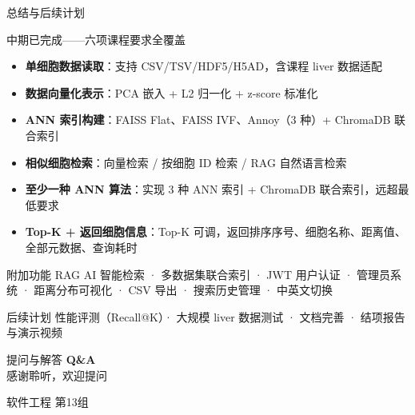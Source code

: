 \documentclass[aspectratio=169]{beamer}
\begin{document}

\begin{frame}{总结与后续计划}
\small

\begin{block}{中期已完成——六项课程要求全覆盖}
  \begin{itemize}
    \item \textbf{单细胞数据读取}：支持 CSV/TSV/HDF5/H5AD，含课程 liver 数据适配
    \item \textbf{数据向量化表示}：PCA 嵌入 + L2 归一化 + z-score 标准化
    \item \textbf{ANN 索引构建}：FAISS Flat、FAISS IVF、Annoy（3 种）+ ChromaDB 联合索引
    \item \textbf{相似细胞检索}：向量检索 / 按细胞 ID 检索 / RAG 自然语言检索
    \item \textbf{至少一种 ANN 算法}：实现 3 种 ANN 索引 + ChromaDB 联合索引，远超最低要求
    \item \textbf{Top-K + 返回细胞信息}：Top-K 可调，返回排序序号、细胞名称、距离值、全部元数据、查询耗时
  \end{itemize}
\end{block}

\vspace{0.2em}
\begin{exampleblock}{附加功能}
  RAG AI 智能检索 · 多数据集联合索引 · JWT 用户认证 · 管理员系统 · 距离分布可视化 · CSV 导出 · 搜索历史管理 · 中英文切换
\end{exampleblock}

\vspace{0.2em}
\begin{exampleblock}{后续计划}
  性能评测（Recall@K）· 大规模 liver 数据测试 · 文档完善 · 结项报告与演示视频
\end{exampleblock}

\end{frame}

\begin{frame}{提问与解答}
  \centering
  \vspace{0.8cm}
  {\Huge {\bfseries Q\&A} \\
  \vspace{0.25em} \Large 感谢聆听，欢迎提问}

  \vspace{1.5cm}
  \normalsize 软件工程 第13组
\end{frame}
\end{document}
